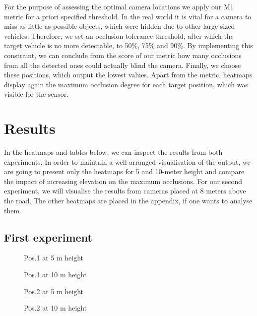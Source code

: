 For the purpose of assessing the optimal camera locations we apply our M1 metric for a priori specified threshold. In the real world it is vital for a camera to miss as little as possible objects, which were hidden due to other large-sized vehicles. Therefore, we set an occlusion tolerance threshold, after which the target vehicle is no more detectable, to 50\%, 75\% and 90\%. By implementing this constraint, we can conclude from the score of our metric how many occlusions from all the detected ones could actually blind the camera. Finally, we choose these positions, which output the lowest values. Apart from the metric, heatmaps display again the maximum occlusion degree for each target position, which was visible for the sensor.


\section{Results}\label{results}
In the heatmaps and tables below, we can inspect the results from both experiments. In order to maintain a well-arranged visualisation of the output, we are going to present only the heatmaps for 5 and 10-meter height and compare the impact of increasing elevation on the maximum occlusions. For our second experiment, we will visualise the results from cameras placed at 8 meters above the road. The other heatmaps are placed in the appendix, if one wants to analyse them.

\subsection{First experiment} \label{subsec:first_exp_heat}

\begin{figure}[!htb]
  
  \caption{Pos.1 at 5 m height}\label{fig:pos1_5m}
\endminipage\hfill
{}
  
  \caption{Pos.1 at 10 m height}\label{fig:pos1_10m}
\endminipage\hfill
\end{figure}

\newpage
\begin{figure}[!ht]
  
  \caption{Pos.2 at 5 m height}\label{fig:pos2_5m}
\endminipage\hfill
{}
  
  \caption{Pos.2 at 10 m height}\label{fig:pos2_10m}
\endminipage\hfill
\end{figure}

